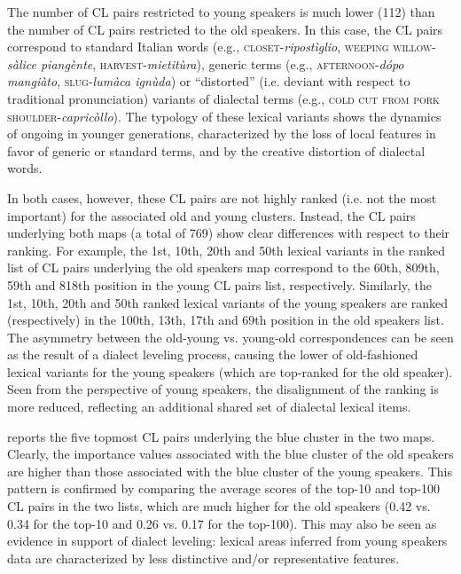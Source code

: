 \documentclass[output=paper]{LSP/langsci}
\begin{document}
The number of CL pairs restricted to young speakers is much lower (112) than the number of CL pairs restricted to the old speakers. In this case, the CL pairs correspond to standard Italian words (e.g., \textsc{closet}{}-\textit{ripostìglio}, \textsc{weeping willow}{}-\textit{sàlice piangènte}, \textsc{harvest}{}-\textit{mietitùra}), generic terms (e.g., \textsc{afternoon}{}-\textit{dópo mangiàto}, \textsc{slug}{}-\textit{lumàca ignùda}) or “distorted” (i.e. deviant with respect to traditional pronunciation) variants of dialectal terms (e.g., \textsc{ cold cut from pork shoulder}{}-\textit{capricòllo}). The typology of these lexical variants shows the dynamics of  ongoing in younger  generations, characterized by the loss of local features in favor of generic or standard terms, and by the creative distortion of dialectal words. 

In both cases, however, these CL pairs are not highly ranked (i.e. not the most important) for the associated old and young clusters. Instead, the CL pairs underlying both maps (a total of 769) show clear differences with respect to their ranking. For example, the 1st, 10th, 20th and 50th lexical variants in the ranked list of CL pairs underlying the old speakers map correspond to the 60th, 809th, 59th and 818th position in the young CL pairs list, respectively. Similarly, the 1st, 10th, 20th and 50th ranked lexical variants of the young speakers are ranked (respectively) in the 100th, 13th, 17th and 69th position in the old speakers list. The asymmetry between the old-young vs. young-old correspondences can be seen as the result of a dialect leveling process, causing the lower  of old-fashioned lexical variants for the young speakers (which are top-ranked for the old speaker). Seen from the perspective of young speakers, the disalignment of the ranking is more reduced, reflecting an additional shared set of dialectal lexical items.

 reports the five topmost CL pairs underlying the blue cluster in the two maps. Clearly, the importance values associated with the blue cluster of the old speakers are higher than those associated with the blue cluster of the young speakers. This pattern is confirmed by comparing the average  scores of the top-10 and top-100 CL pairs in the two lists, which are much higher for the old speakers (0.42 vs. 0.34 for the top-10 and 0.26 vs. 0.17 for the top-100). This may also be seen as evidence in support of dialect leveling: lexical areas inferred from young speakers data are characterized by less distinctive and/or representative features. 
\end{document}
